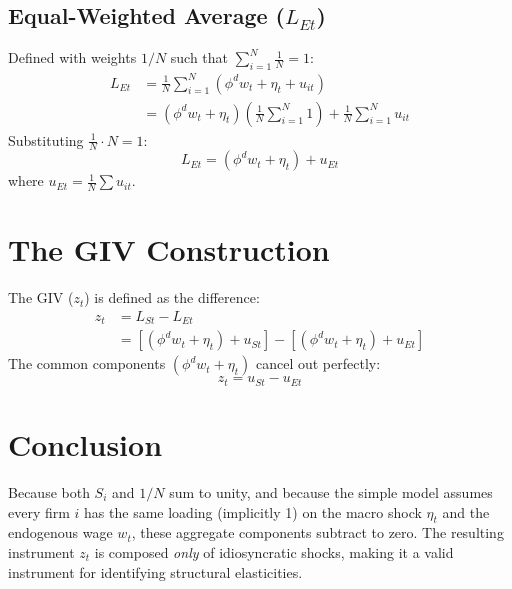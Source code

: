 \documentclass[11pt]{article}
\begin{document}
\subsection{Equal-Weighted Average ($L_{Et}$)}
Defined with weights $1/N$ such that $\sum_{i=1}^N \frac{1}{N} = 1$:
\begin{align}
    L_{Et} &= \frac{1}{N} \sum_{i=1}^N (\phi^d w_t + \eta_t + u_{it}) \\
    &= (\phi^d w_t + \eta_t) \left( \frac{1}{N} \sum_{i=1}^N 1 \right) + \frac{1}{N} \sum_{i=1}^N u_{it}
\end{align}
Substituting $\frac{1}{N} \cdot N = 1$:
\begin{equation}
    L_{Et} = (\phi^d w_t + \eta_t) + u_{Et}
\end{equation}
where $u_{Et} = \frac{1}{N} \sum u_{it}$.

\section{The GIV Construction}
The GIV ($z_t$) is defined as the difference:
\begin{align}
    z_t &= L_{St} - L_{Et} \\
    &= \left[ (\phi^d w_t + \eta_t) + u_{St} \right] - \left[ (\phi^d w_t + \eta_t) + u_{Et} \right]
\end{align}
The common components $(\phi^d w_t + \eta_t)$ cancel out perfectly:
\begin{equation}
    z_t = u_{St} - u_{Et}
\end{equation}

\section{Conclusion}
Because both $S_i$ and $1/N$ sum to unity, and because the simple model assumes every firm $i$ has the same loading (implicitly 1) on the macro shock $\eta_t$ and the endogenous wage $w_t$, these aggregate components subtract to zero. The resulting instrument $z_t$ is composed \textit{only} of idiosyncratic shocks, making it a valid instrument for identifying structural elasticities.
\end{document}
